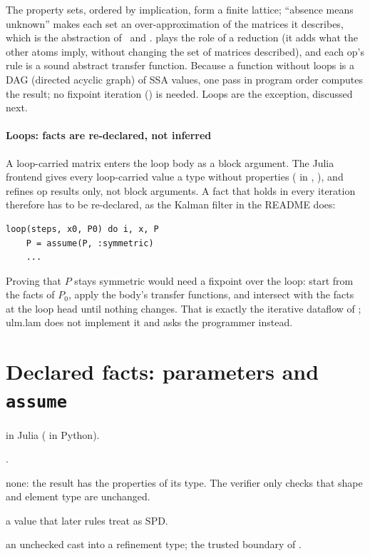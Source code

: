 \begin{theory}
The property sets, ordered by implication, form a finite lattice; ``absence
means unknown'' makes each set an over-approximation of the matrices it
describes, which is the abstraction of~\cite{cousot} and
.
 plays the role of a reduction (it adds what the other atoms
imply, without changing the set of matrices described), and each op's rule
is a sound abstract transfer function. Because a function without loops is
a DAG (directed acyclic graph) of SSA values, one pass in program order
computes the result; no fixpoint iteration
() is
needed. Loops are the exception, discussed next.
\end{theory}

\paragraph{Loops: facts are re-declared, not inferred} A loop-carried
matrix enters the loop body as a block argument. The Julia frontend gives
every loop-carried value a type without properties ( in
, ), and
 refines op results only, not block
arguments. A fact that holds in every iteration therefore has to be
re-declared, as the Kalman filter in the README does:
\begin{lstlisting}[style=jl]
loop(steps, x0, P0) do i, x, P
    P = assume(P, :symmetric)
    ...
\end{lstlisting}
Proving that \(P\) stays symmetric would need a fixpoint over the loop: start
from the facts of \(P_0\), apply the body's transfer functions, and
intersect with the facts at the loop head until nothing changes. That is
exactly the iterative dataflow of ; ulm.lam does not implement it
and asks the programmer instead.

\section{Declared facts: parameters and \texttt{assume}}
\label{sec:facts-declared}

\begin{steps}
\item[Input]  in Julia ( in Python).
\item[Representation] .
\item[Rule] none: the result has the properties of its type. The verifier only checks that shape and element type are unchanged.
\item[Output] a value that later rules treat as SPD.
\item[Theory] an unchecked cast into a refinement type; the trusted boundary of .
\end{steps}

